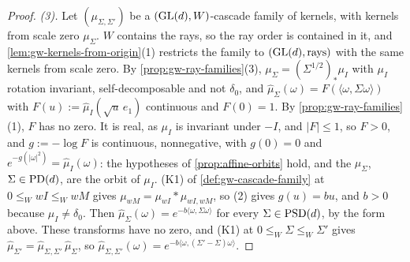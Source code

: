 \begin{proof}
\emph{(3).} Let $(\mu_{\Sigma,\Sigma'})$ be a $(\mathrm{GL}(d), W)$-cascade family of kernels, with kernels from scale zero $\mu_\Sigma$. $W$ contains the rays, so the ray order is contained in it, and
\ref{lem:gw-kernels-from-origin}(1) restricts the family to $(\mathrm{GL}(d), \text{rays})$ with the same kernels
from scale zero. By \ref{prop:gw-ray-families}(3), $\mu_\Sigma = (\Sigma^{1/2})_*\mu_I$ with $\mu_I$
rotation invariant, self-decomposable and not $\delta_0$, and $\widehat\mu_\Sigma(\omega) =
F(\langle\omega,\Sigma\omega\rangle)$ with $F(u) := \widehat\mu_I(\sqrt u\,e_1)$ continuous and $F(0) = 1$. By
\ref{prop:gw-ray-families}(1), $F$ has no zero. It is real, as $\mu_I$ is invariant under $-I$, and
$|F| \le 1$, so $F > 0$, and $g := -\log F$ is continuous, nonnegative, with $g(0) = 0$ and
$e^{-g(|\omega|^2)} = \widehat\mu_I(\omega)$: the hypotheses of \ref{prop:affine-orbits} hold, and the
$\mu_\Sigma$, $\Sigma \in \mathrm{PD}(d)$, are the orbit of $\mu_I$. (K1) of \ref{def:gw-cascade-family} at $0 \le_W wI \le_W wM$ gives
$\mu_{wM} = \mu_{wI} * \mu_{wI,wM}$, so (2) gives $g(u) = bu$, and $b > 0$ because $\mu_I \ne \delta_0$.
Then $\widehat\mu_\Sigma(\omega) = e^{-b\langle\omega,\Sigma\omega\rangle}$ for every $\Sigma \in \mathrm{PSD}(d)$, by
the form above. These transforms have no zero, and (K1) at $0 \le_W \Sigma \le_W \Sigma'$ gives
$\widehat\mu_{\Sigma'} = \widehat\mu_{\Sigma,\Sigma'}\,\widehat\mu_\Sigma$, so
$\widehat\mu_{\Sigma,\Sigma'}(\omega) = e^{-b\langle\omega,(\Sigma'-\Sigma)\omega\rangle}$.
\end{proof}

\medskip

